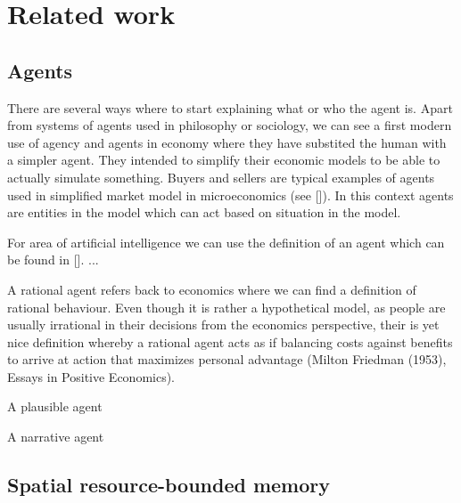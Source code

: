 \chapter{Related work}

\section{Agents}

There are several ways where to start explaining what or who the agent is. Apart from systems of agents used in philosophy or sociology, we can see a first modern use of agency and agents in economy where they have substited the human with a simpler agent. They intended to simplify their economic models to be able to actually simulate something. Buyers and sellers are typical examples of agents used in simplified market model in microeconomics (see []). In this context agents are entities in the model which can act based on situation in the model.

For area of artificial intelligence we can use the definition of an agent which can be found in []. {...} 

A rational agent refers back to economics where we can find a definition of rational behaviour. Even though it is rather a hypothetical model, as people are usually irrational in their decisions from the economics perspective, their is yet nice definition whereby a rational agent acts as if balancing costs against benefits to arrive at action that maximizes personal advantage (Milton Friedman (1953), Essays in Positive Economics).

A plausible agent
 
A narrative agent



\section{Spatial resource-bounded memory}